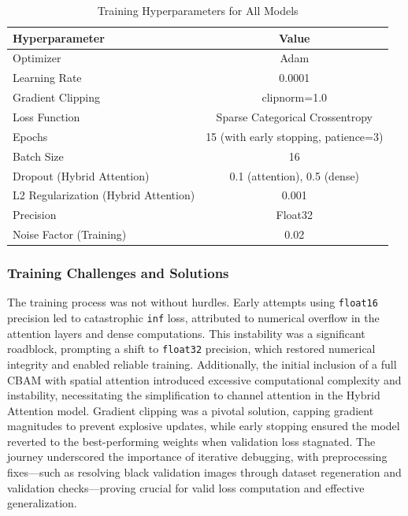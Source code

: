 \documentclass[12pt]{article}
\begin{document}
\begin{table}[h]
    \centering
    \caption{Training Hyperparameters for All Models}
    \label{tab:hyperparameters_partb}
    \begin{tabular}{lc}
        \toprule
        \textbf{Hyperparameter} & \textbf{Value} \\
        \midrule
        Optimizer & Adam \\
        Learning Rate & 0.0001 \\
        Gradient Clipping & clipnorm=1.0 \\
        Loss Function & Sparse Categorical Crossentropy \\
        Epochs & 15 (with early stopping, patience=3) \\
        Batch Size & 16 \\
        Dropout (Hybrid Attention) & 0.1 (attention), 0.5 (dense) \\
        L2 Regularization (Hybrid Attention) & 0.001 \\
        Precision & Float32 \\
        Noise Factor (Training) & 0.02 \\
        \bottomrule
    \end{tabular}
\end{table}

\subsubsection{Training Challenges and Solutions}
The training process was not without hurdles. Early attempts using \texttt{float16} precision led to catastrophic \texttt{inf} loss, attributed to numerical overflow in the attention layers and dense computations. This instability was a significant roadblock, prompting a shift to \texttt{float32} precision, which restored numerical integrity and enabled reliable training. Additionally, the initial inclusion of a full CBAM with spatial attention introduced excessive computational complexity and instability, necessitating the simplification to channel attention in the Hybrid Attention model. Gradient clipping was a pivotal solution, capping gradient magnitudes to prevent explosive updates, while early stopping ensured the model reverted to the best-performing weights when validation loss stagnated. The journey underscored the importance of iterative debugging, with preprocessing fixes—such as resolving black validation images through dataset regeneration and validation checks—proving crucial for valid loss computation and effective generalization.
\end{document}
